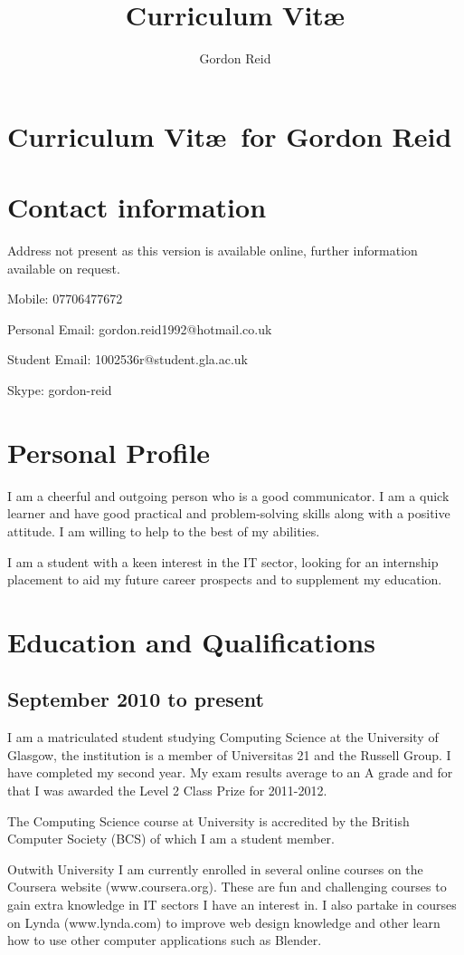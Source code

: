 \documentclass[10pt,a4paper]{article}
\title{Curriculum Vit\ae}
\author{Gordon Reid}
\begin{document}
\section*{Curriculum Vit\ae\ for Gordon Reid}
\section*{Contact information}
Address not present as this version is available online, further information 
available on request.

Mobile: 07706477672

Personal Email: gordon.reid1992@hotmail.co.uk

Student Email: 1002536r@student.gla.ac.uk

Skype: gordon-reid
\section*{Personal Profile}
I am a cheerful and outgoing person who is a good communicator. I am a quick 
learner and have good practical and problem-solving skills along with a 
positive attitude. I am willing to help to the best of my abilities.

I am a student with a keen interest in the IT sector, looking for an 
internship placement to aid my future career prospects and to supplement my 
education.
\section*{Education and Qualifications}
\subsection*{September 2010 to present}
I am a matriculated student studying Computing Science at the University of 
Glasgow, the institution is a member of Universitas 21 and the Russell Group.
I have completed my second year. My exam results average to an A grade and 
for that I was awarded the Level 2 Class Prize for 2011-2012.

The Computing Science course at University is accredited by the British 
Computer Society (BCS) of which I am a student member.

Outwith University I am currently enrolled in several online courses on the 
Coursera website (www.coursera.org). These are fun and challenging courses to 
gain extra knowledge in IT sectors I have an interest in. I also partake in 
courses on Lynda (www.lynda.com) to improve web design knowledge and other 
learn how to use other computer applications such as Blender.
\end{document}
